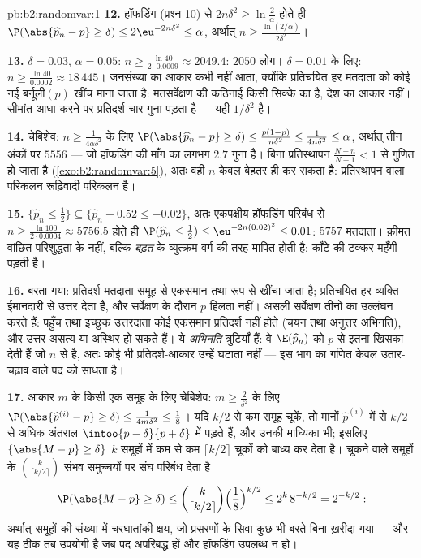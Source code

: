 \begin{solution}{pb:b2:randomvar:1}
\textbf{12.} हॉफडिंग (प्रश्न 10) से $2n\delta^2 \geq \ln\frac2\alpha$ होते ही $\P(\abs{\widehat
p_n - p} \geq \delta) \leq 2\eu^{-2n\delta^2} \leq \alpha$, अर्थात् $n \geq
\frac{\ln(2/\alpha)}{2\delta^2}$।

\textbf{13.} $\delta = 0.03$, $\alpha = 0.05$: $n \geq
\frac{\ln 40}{2\cdot0.0009} \approx 2049.4$: $2050$ लोग। $\delta = 0.01$ के लिए: $n \geq \frac{\ln40}{0.0002} \approx
18\,445$। जनसंख्या का
आकार कभी नहीं आता, क्योंकि प्रतिचयित हर मतदाता को कोई नई
बर्नूली$(p)$ खींच माना जाता है: मतसर्वेक्षण की कठिनाई किसी सिक्के का
 है, देश का आकार नहीं। सीमांत आधा करने पर प्रतिदर्श चार गुना
पड़ता है --- यही $1/\delta^2$  है।

\textbf{14.} चेबिशेव: $n \geq
\frac1{4\alpha\delta^2}$ के लिए $\P(\abs{\widehat p_n - p} \geq
\delta) \leq \frac{p(1-p)}{n\delta^2} \leq
\frac1{4n\delta^2} \leq \alpha$, अर्थात् तीन अंकों पर $5556$ ---
जो हॉफडिंग की माँग का लगभग $2.7$ गुना है। बिना प्रतिस्थापन 
$\frac{N -
n}{N-1} < 1$ से गुणित हो जाता है (\cref{exo:b2:randomvar:5}), अतः वही $n$ केवल बेहतर ही कर सकता
है: प्रतिस्थापन वाला परिकलन रूढ़िवादी परिकलन है।

\textbf{15.} $\{\widehat p_n \leq \frac12\} \subseteq
\{\widehat p_n - 0.52 \leq -0.02\}$, अतः एकपक्षीय हॉफडिंग परिबंध से $n \geq \frac{\ln
100}{2\cdot0.0004} \approx 5756.5$ होते ही $\P(\widehat p_n \leq \tfrac12) \leq
\eu^{-2n(0.02)^2} \leq 0.01$:
$5757$ मतदाता। क़ीमत वांछित परिशुद्धता के नहीं, बल्कि \emph{बढ़त} के
व्युत्क्रम वर्ग की तरह मापित होती है: काँटे की टक्कर महँगी पड़ती है।

\textbf{16.} बरता गया: प्रतिदर्श मतदाता-समूह से एकसमान तथा
 रूप से खींचा जाता है; प्रतिचयित हर व्यक्ति ईमानदारी से
उत्तर देता है, और सर्वेक्षण के दौरान $p$ हिलता नहीं। असली
सर्वेक्षण तीनों का उल्लंघन करते हैं: पहुँच  तथा इच्छुक
उत्तरदाता कोई एकसमान प्रतिदर्श नहीं होते (चयन तथा अनुत्तर अभिनति),
और उत्तर असत्य या अस्थिर हो सकते हैं। ये \emph{अभिनति} त्रुटियाँ
हैं: वे $\E(\widehat p_n)$ को $p$ से इतना खिसका देती हैं जो $n$ से  है,
अतः कोई भी प्रतिदर्श-आकार उन्हें घटाता नहीं --- इस भाग का गणित केवल
उतार-चढ़ाव वाले पद को साधता है।

\textbf{17.} आकार $m$ के किसी एक समूह के लिए चेबिशेव: $m \geq \frac2{\delta^2}$ के लिए
$\P(\abs{
\widehat p^{(i)} - p} \geq \delta) \leq \frac{1}{4m\delta^2}
\leq \frac18$। यदि $k/2$ से कम समूह चूकें, तो मानों $\widehat p^{(i)}$ में से $k/2$ से अधिक
 अंतराल $\intoo{p -
\delta}{p + \delta}$ में पड़ते हैं, और उनकी माध्यिका भी; इसलिए $\{\abs{M - p} \geq \delta\}$ $k$
 समूहों में कम से कम $\lceil
k/2\rceil$ चूकों को बाध्य कर देता है। चूकने
वाले समूहों के $\binom k{\lceil k/2\rceil}$ संभव समुच्चयों पर संघ परिबंध देता है
\[
\P(\abs{M - p} \geq \delta)
\leq \binom{k}{\lceil k/2\rceil}
\Bigl(\frac18\Bigr)^{k/2}
\leq 2^k\,8^{-k/2} = 2^{-k/2} :
\]
अर्थात् समूहों की संख्या में चरघातांकी क्षय, जो प्रसरणों के सिवा
कुछ भी बरते बिना ख़रीदा गया --- और यह ठीक तब उपयोगी है जब पद
अपरिबद्ध हों और हॉफडिंग उपलब्ध न हो।


\end{solution}
